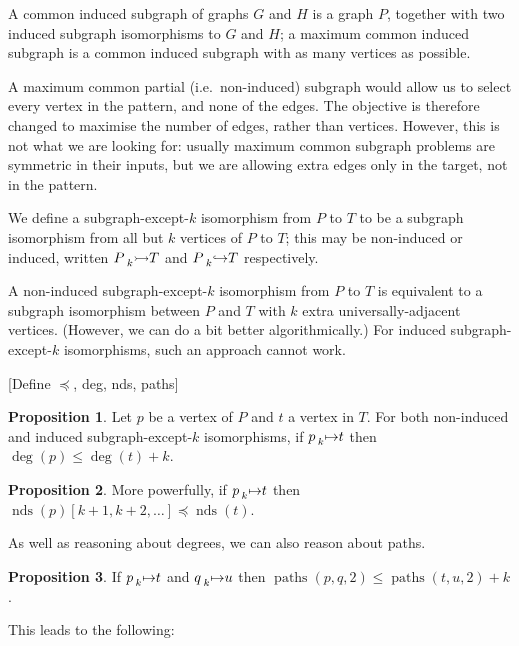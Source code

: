 \documentclass[letterpaper]{article}
\theoremstyle{definition}
\newtheorem{proposition}{Proposition}
\newcommand{\todo}[1]{{\color{red} {[}{#1}{]}}}
\begin{document}
A common induced subgraph of graphs $G$ and $H$ is a graph $P$, together with two induced subgraph
isomorphisms to $G$ and $H$; a maximum common induced subgraph is a common induced subgraph with as
many vertices as possible.

A maximum common partial (i.e.\ non-induced) subgraph would allow us to select every vertex in the
pattern, and none of the edges. The objective is therefore changed to maximise the number of edges,
rather than vertices. However, this is not what we are looking for: usually maximum common subgraph
problems are symmetric in their inputs, but we are allowing extra edges only in the target, not in
the pattern.

We define a subgraph-except-$k$ isomorphism from $P$ to $T$ to be a subgraph isomorphism from all
but $k$ vertices of $P$ to $T$; this may be non-induced or induced, written
$P \prescript{}{k}{\rightarrowtail} T$ and $P \prescript{}{k}{\hookrightarrow} T$ respectively.

A non-induced subgraph-except-$k$ isomorphism from $P$ to $T$ is equivalent to a subgraph
isomorphism between $P$ and $T$ with $k$ extra universally-adjacent vertices. (However, we can do a
bit better algorithmically.) For induced subgraph-except-$k$ isomorphisms, such an approach cannot
work.

\todo{Define $\preceq$, deg, nds, paths}

\begin{proposition}
    Let $p$ be a vertex of $P$ and $t$ a vertex in $T$. For both non-induced and induced
    subgraph-except-$k$ isomorphisms, if $p \prescript{}{k}{\mapsto} t$ then
    $\operatorname{deg}(p) \le \operatorname{deg}(t) + k$.
\end{proposition}

\begin{proposition}
    More powerfully, if $p \prescript{}{k}{\mapsto} t$ then
    $\operatorname{nds}(p)[k+1, k+2, \ldots] \preceq \operatorname{nds}(t)$.
\end{proposition}

As well as reasoning about degrees, we can also reason about paths.

\begin{proposition}
    If $p \prescript{}{k}{\mapsto} t$ and $q \prescript{}{k}{\mapsto} u$ then
     $\operatorname{paths}(p, q, 2) \le \operatorname{paths}(t, u, 2) + k$.
\end{proposition}

This leads to the following:
\end{document}

